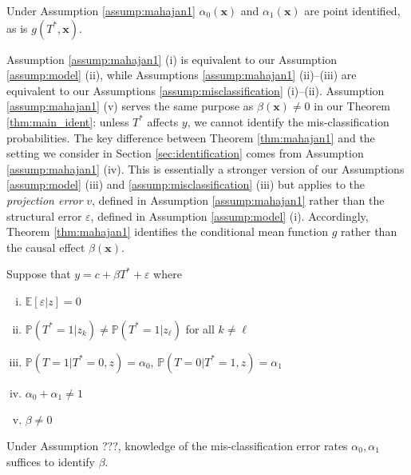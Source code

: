 \begin{thm}
  Under Assumption \ref{assump:mahajan1} $\alpha_0(\mathbf{x})$ and $\alpha_1(\mathbf{x})$ are point identified, as is $g(T^*,\mathbf{x})$.
  \label{thm:mahajan1}
\end{thm}

Assumption \ref{assump:mahajan1} (i) is equivalent to our Assumption \ref{assump:model} (ii), while Assumptions \ref{assump:mahajan1} (ii)--(iii) are equivalent to our Assumptions \ref{assump:misclassification} (i)--(ii).
Assumption \ref{assump:mahajan1} (v) serves the same purpose as $\beta(\mathbf{x}) \neq 0$ in our Theorem \ref{thm:main_ident}: unless $T^*$ affects $y$, we cannot identify the mis-classification probabilities.
The key difference between Theorem \ref{thm:mahajan1} and the setting we consider in Section \ref{sec:identification} comes from Assumption \ref{assump:mahajan1} (iv). 
This is essentially a stronger version of our Assumptions \ref{assump:model} (iii) and \ref{assump:misclassification} (iii) but applies to the \emph{projection error} $v$, defined in Assumption \ref{assump:mahajan1} rather than the structural error $\varepsilon$, defined in Assumption \ref{assump:model} (i).
Accordingly, Theorem \ref{thm:mahajan1} identifies the conditional mean function $g$ rather than the causal effect $\beta(\mathbf{x})$.


\newpage

\begin{assump}[Mahajan A2]\mbox{}
  Suppose that $y = c+ \beta T^* + \varepsilon$ where
  \begin{enumerate}[(i)]
    \item $\mathbb{E}[\varepsilon|z]=0$
    \item $\mathbb{P}(T^*=1|z_k)\neq \mathbb{P}(T^*=1|z_\ell)$ for all $k\neq \ell$
    \item $\mathbb{P}(T = 1| T^* = 0, z) = \alpha_0$, $\mathbb{P}(T = 0| T^* = 1, z) = \alpha_1$
    \item $\alpha_0 + \alpha_1 \neq 1$
    \item $\beta \neq 0$
  \end{enumerate}
\end{assump}

\begin{lem}[Mahajan A2]
Under Assumption ???, knowledge of the mis-classification error rates $\alpha_0, \alpha_1$ suffices to identify $\beta$.
\end{lem}

